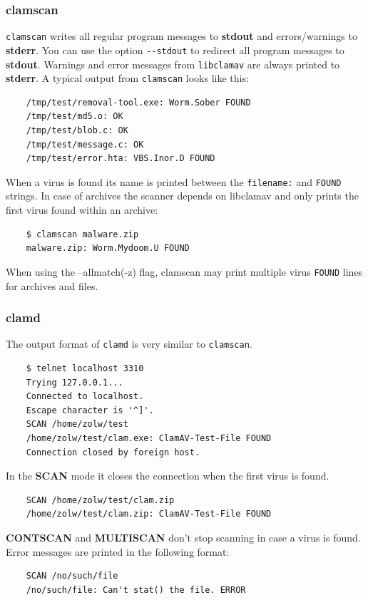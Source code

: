 \documentclass[a4paper,titlepage,12pt]{article}
\begin{document}
    \subsubsection{clamscan}
    \verb+clamscan+ writes all regular program messages to \textbf{stdout} and
    errors/warnings to \textbf{stderr}. You can use the option \verb+--stdout+
    to redirect all program messages to \textbf{stdout}. Warnings and error
    messages from \verb+libclamav+ are always printed to \textbf{stderr}.
    A typical output from \verb+clamscan+ looks like this:
    \begin{verbatim}
	/tmp/test/removal-tool.exe: Worm.Sober FOUND
	/tmp/test/md5.o: OK
	/tmp/test/blob.c: OK
	/tmp/test/message.c: OK
	/tmp/test/error.hta: VBS.Inor.D FOUND
    \end{verbatim}
    When a virus is found its name is printed between the \verb+filename:+ and
    \verb+FOUND+ strings. In case of archives the scanner depends on libclamav
    and only prints the first virus found within an archive:
    \begin{verbatim}
	$ clamscan malware.zip 
	malware.zip: Worm.Mydoom.U FOUND
    \end{verbatim}
    When using the --allmatch(-z) flag, clamscan may print multiple virus
    \verb+FOUND+ lines for archives and files.

    \subsubsection{clamd}
    The output format of \verb+clamd+ is very similar to \verb+clamscan+.
    \begin{verbatim}
	$ telnet localhost 3310
	Trying 127.0.0.1...
	Connected to localhost.
	Escape character is '^]'.
	SCAN /home/zolw/test
	/home/zolw/test/clam.exe: ClamAV-Test-File FOUND
	Connection closed by foreign host.
    \end{verbatim}
    In the \textbf{SCAN} mode it closes the connection when the first virus
    is found.
    \begin{verbatim}
	SCAN /home/zolw/test/clam.zip
	/home/zolw/test/clam.zip: ClamAV-Test-File FOUND
    \end{verbatim}
    \textbf{CONTSCAN} and \textbf{MULTISCAN} don't stop scanning in case
    a virus is found.\\
    Error messages are printed in the following format:
    \begin{verbatim}
	SCAN /no/such/file
	/no/such/file: Can't stat() the file. ERROR
    \end{verbatim}
\end{document}
